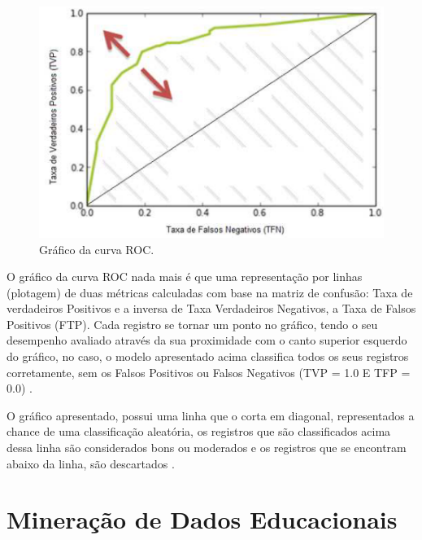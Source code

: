 \par
\begin{figure}[!htp]
	\begin{center}
    \caption{\label{fig:waveform_fig} Gráfico da curva ROC.}
	\includegraphics[scale=0.80]{Figuras/Curva_roc.png}
	\end{center}
\end{figure}

\par
O gráfico da curva ROC nada mais é que uma representação por linhas (plotagem) de duas métricas calculadas com base na matriz de confusão: Taxa de verdadeiros Positivos e a inversa de Taxa Verdadeiros Negativos, a Taxa de Falsos Positivos (FTP). Cada registro se tornar um ponto no gráfico, tendo o seu desempenho avaliado através da sua proximidade com o canto superior esquerdo do gráfico, no caso, o modelo apresentado acima classifica todos os seus registros corretamente, sem os Falsos Positivos ou Falsos Negativos (TVP = 1.0 E TFP = 0.0) \cite{Cesar, Carvalho2014}.

\par
O gráfico apresentado, possui uma linha que o corta em diagonal, representados a chance de uma classificação aleatória, os registros que são classificados acima dessa linha são considerados bons ou moderados e os registros que se encontram abaixo da linha, são descartados \cite{Carvalho2014}.



\section{Mineração de Dados Educacionais}

